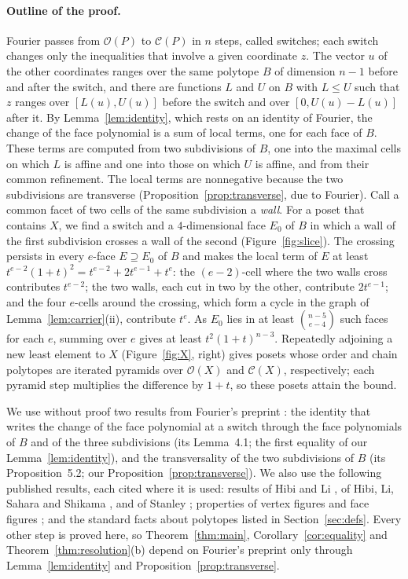 \documentclass[11pt]{article}
\theoremstyle{definition}
\theoremstyle{remark}
\newcommand{\OO}{\mathcal O}
\newcommand{\CC}{\mathcal C}
\begin{document}
\paragraph{Outline of the proof.}
Fourier \cite{Fourier} passes from $\OO(P)$ to $\CC(P)$ in $n$ steps,
called switches; each switch changes only the inequalities that involve
a given coordinate $z$. The vector $u$ of the other coordinates ranges over the same polytope $B$
of dimension $n-1$ before and after the switch, and there are functions $L$ and $U$ on $B$ with $L\leq U$ such that $z$ ranges over $[L(u),U(u)]$ before the
switch and over $[0,U(u)-L(u)]$ after it. By Lemma~\ref{lem:identity}, which rests on an identity of Fourier, the change of the face polynomial is a sum of local terms, one for each face of $B$. These terms are computed from two subdivisions of $B$, one into the maximal cells on which $L$ is affine and one into those on which $U$ is affine, and from their common refinement. The local terms are nonnegative because the two subdivisions are transverse (Proposition~\ref{prop:transverse}, due to Fourier). Call a common facet of two cells of the same subdivision a \emph{wall}. For a poset that contains $X$, we find a switch and a $4$-dimensional face $E_0$ of $B$ in which a wall of the first subdivision crosses a wall of the second (Figure~\ref{fig:slice}). The crossing persists in every $e$-face
$E\supseteq E_0$ of $B$ and makes the local term of $E$ at least
$t^{e-2}(1+t)^2=t^{e-2}+2t^{e-1}+t^e$: the $(e-2)$-cell where the two walls cross
contributes $t^{e-2}$; the two walls, each cut in two by the other, contribute $2t^{e-1}$; and the four $e$-cells around the crossing, which form a cycle in the graph of Lemma~\ref{lem:carrier}(ii), contribute $t^e$. As $E_0$ lies in at least
$\binom{n-5}{e-4}$ such faces for each $e$, summing over $e$ gives at least
$t^2(1+t)^{n-3}$. Repeatedly adjoining a new least element to $X$ (Figure~\ref{fig:X}, right) gives posets whose order and chain polytopes are iterated pyramids over $\OO(X)$ and $\CC(X)$, respectively; each pyramid step multiplies
the difference by $1+t$, so these posets attain the bound.

We use without proof two results from Fourier's preprint \cite{Fourier}: the identity that writes the change
of the face polynomial at a switch through the face polynomials of $B$ and of the three subdivisions (its Lemma~4.1;
the first equality of our Lemma~\ref{lem:identity}), and the transversality of the two subdivisions of $B$ (its Proposition~5.2;
our Proposition~\ref{prop:transverse}).
We also use the following published results, each cited where it is used: results of Hibi and Li \cite[Theorem~2.1 and Lemma~1.1]{HL}, of Hibi, Li, Sahara and Shikama \cite[Theorem~2.1]{HLSS}, and of Stanley \cite[Corollary~1.3 and Theorem~2.2]{Stanley}; properties of vertex figures and face figures \cite[Proposition~2.4 and Chapter~2]{Ziegler}; and the standard facts about polytopes listed in Section~\ref{sec:defs}. Every other step is proved here, so Theorem~\ref{thm:main},
Corollary~\ref{cor:equality} and Theorem~\ref{thm:resolution}(b) depend on Fourier's preprint only through
Lemma~\ref{lem:identity} and Proposition~\ref{prop:transverse}.
\end{document}
